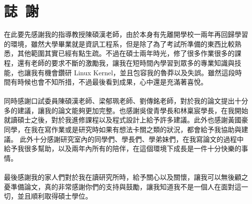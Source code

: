 \chapter*{誌~謝~}

\indent
在此要先感謝我的指導教授陳碩漢老師，由於本身有先離開學校一兩年再回歸學習的環境，雖然大學畢業就是資訊工程系，但是除了為了考試所準備的東西比較熟悉，其他範圍其實已經有點生疏。不過在碩士兩年時光，修了很多作業很多的課程，還有老師的要求不斷的激勵我，讓我在短時間內學習到眾多的專業知識與技能，也讓我有機會鑽研 Linux Kernel，並且包容我的魯莽以及失誤。雖然這段時間有時候也會不知所措，不過最後看到成果，心中還是充滿著喜悅。
\\ \hspace*{\fill} \\
\indent
同時感謝口試委員陳碩漢老師、梁郁珮老師、劉傳銘老師，對於我的論文提出十分多的建議，讓我的論文能夠更加完整。也感謝吳俊青學長和林稟宸學長，在我開始就讀碩士之後，對於我進修課程以及程式設計上給予許多建議。此外也感謝黃國豪同學，在我在寫作業或是研究時如果有想法卡關之類的狀況，都會給予我協助與建議。
此外十分感謝研究室內的同學們、學長們、學弟妹們，在我寫論文的過程中給予我很多幫助，以及兩年內所有的陪伴，在這個環境下成長是一件十分快樂的事情。
\\ \hspace*{\fill} \\
\indent
最後感謝我的家人們對於我在讀研究所時，給予關心以及關懷，讓我可以無後顧之憂準備論文，真的非常感謝你們的支持與鼓勵，讓我知道我不是一個人在面對這一切，並且順利取得碩士學位。


